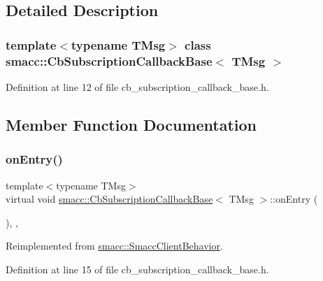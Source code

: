 \subsection{Detailed Description}
\subsubsection*{template$<$typename T\+Msg$>$\newline
class smacc\+::\+Cb\+Subscription\+Callback\+Base$<$ T\+Msg $>$}



Definition at line 12 of file cb\+\_\+subscription\+\_\+callback\+\_\+base.\+h.



\subsection{Member Function Documentation}
\mbox{\label{classsmacc_1_1CbSubscriptionCallbackBase_a1092b6c0d6fd428be86939559bed1e16}} 
\subsubsection{\texorpdfstring{on\+Entry()}{onEntry()}}
{\footnotesize\ttfamily template$<$typename T\+Msg$>$ \\
virtual void \hyperlink{classsmacc_1_1CbSubscriptionCallbackBase}{smacc\+::\+Cb\+Subscription\+Callback\+Base}$<$ T\+Msg $>$\+::on\+Entry (\begin{DoxyParamCaption}{ }\end{DoxyParamCaption})\hspace{0.3cm}{\ttfamily [inline]}, {\ttfamily [override]}, {\ttfamily [virtual]}}



Reimplemented from \hyperlink{classsmacc_1_1SmaccClientBehavior_ad5d3e1f1697c3cfe66c94cadba948493}{smacc\+::\+Smacc\+Client\+Behavior}.



Definition at line 15 of file cb\+\_\+subscription\+\_\+callback\+\_\+base.\+h.


